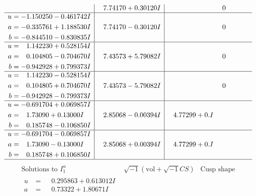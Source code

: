 \documentclass[1p]{elsarticle_modified}
\theoremstyle{definition}
\newcommand{\I}{\sqrt{-1}}
\begin{document}
$$\begin{array}{c|c|c}
 & \phantom{-}7.74170 + 0.30120 I & \phantom{-0.000000 } 0 \\ \hline\begin{aligned}
u &= -1.150250 - 0.461742 I \\
a &= -0.335761 + 1.188530 I \\
b &= -0.844510 - 0.830835 I\end{aligned}
 & \phantom{-}7.74170 - 0.30120 I & \phantom{-0.000000 } 0 \\ \hline\begin{aligned}
u &= \phantom{-}1.142230 + 0.528154 I \\
a &= \phantom{-}0.104805 - 0.704670 I \\
b &= -0.942928 + 0.799373 I\end{aligned}
 & \phantom{-}7.43573 + 5.79082 I & \phantom{-0.000000 } 0 \\ \hline\begin{aligned}
u &= \phantom{-}1.142230 - 0.528154 I \\
a &= \phantom{-}0.104805 + 0.704670 I \\
b &= -0.942928 - 0.799373 I\end{aligned}
 & \phantom{-}7.43573 - 5.79082 I & \phantom{-0.000000 } 0 \\ \hline\begin{aligned}
u &= -0.691704 + 0.069857 I \\
a &= \phantom{-}1.73090 + 0.13000 I \\
b &= \phantom{-}0.185748 - 0.106850 I\end{aligned}
 & \phantom{-}2.85068 - 0.00394 I & \phantom{-}4.77299 + 0. I\phantom{ +0.000000I} \\ \hline\begin{aligned}
u &= -0.691704 - 0.069857 I \\
a &= \phantom{-}1.73090 - 0.13000 I \\
b &= \phantom{-}0.185748 + 0.106850 I\end{aligned}
 & \phantom{-}2.85068 + 0.00394 I & \phantom{-}4.77299 + 0. I\phantom{ +0.000000I}\\
 \hline 
 \end{array}$$\newpage$$\begin{array}{c|c|c}  
\text{Solutions to }I^u_{1}& \I (\text{vol} + \sqrt{-1}CS) & \text{Cusp shape}\\
 \hline 
\begin{aligned}
u &= \phantom{-}0.295863 + 0.613012 I \\
a &= \phantom{-}0.73322 + 1.80671 I \\

\end{aligned}
\end{array}$$
\end{document}

